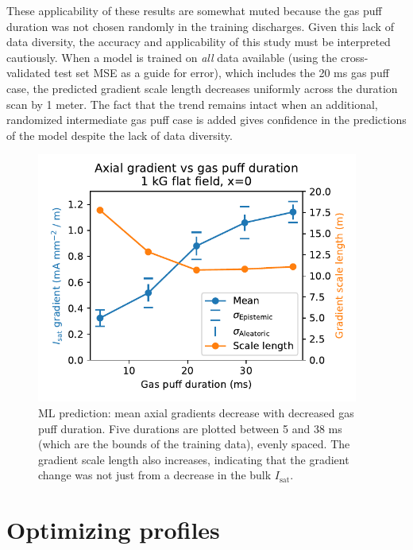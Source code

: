 These applicability of these results are somewhat muted because the gas puff duration was not chosen randomly in the training discharges. 
Given this lack of data diversity, the accuracy and applicability of this study must be interpreted cautiously. When a model is trained on \emph{all} data available (using the cross-validated test set MSE as a guide for error), which includes the 20 ms gas puff case, the predicted gradient scale length decreases uniformly across the duration scan by 1 meter. The fact that the trend remains intact when an additional, randomized intermediate gas puff case is added gives confidence in the predictions of the model despite the lack of data diversity.

\begin{figure}
	\centering
	\includegraphics[width=300pt]{figures/axial-grad_gas-puff.pdf}
	\caption[Predictions of axial gradient]{\label{fig:axial-grad_gas-puff.pdf}ML prediction: mean axial gradients decrease with decreased gas puff duration. Five durations are plotted between 5 and 38 ms (which are the bounds of the training data), evenly spaced. The gradient scale length also increases, indicating that the gradient change was not just from a decrease in the bulk $I_\text{sat}$.}
\end{figure}

\section{Optimizing profiles}
\label{sec:optimization}

